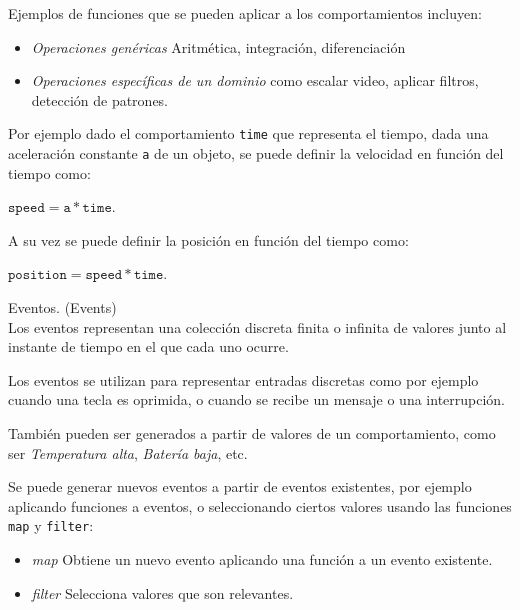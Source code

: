   Ejemplos de funciones que se pueden aplicar a los
comportamientos incluyen:

\begin{itemize}
\item \textit{Operaciones genéricas} Aritmética, integración, diferenciación
\item {
    \textit{Operaciones específicas de un dominio} como escalar video,
    aplicar filtros, detección de patrones.
}
\end{itemize}

  Por ejemplo dado el comportamiento \texttt{time} que representa el tiempo,
dada una aceleración constante \texttt{a} de un objeto, se puede definir la
velocidad en función del tiempo como:
    \begin{center}
    $\texttt{speed} = \texttt{a} * \texttt{time}$.
    \end{center}
  
  A su vez se puede definir la posición en función del tiempo como:
  \begin{center}    
  $\texttt{position} = \texttt{speed} * \texttt{time}$.
  \end{center}

\begin{definicion}
  Eventos. (Events)\cite{petersonhudakelliot99:lambdainmotion} \\

  Los eventos representan una colección discreta finita o infinita de valores
  junto al instante de tiempo en el que cada uno ocurre.


\end{definicion}

  Los eventos se utilizan para representar entradas discretas como por
ejemplo cuando una tecla es oprimida, o cuando se recibe un
mensaje o una interrupción.

  También pueden ser generados a partir de valores de un comportamiento,
como ser \emph{Temperatura alta}, \emph{Batería baja}, etc.

  Se puede generar nuevos eventos a partir de eventos existentes, por
ejemplo aplicando funciones a eventos, o seleccionando ciertos valores
usando las funciones \texttt{map} y \texttt{filter}:

\begin{itemize}
  \item {
      \textit{map} Obtiene un nuevo evento aplicando una función
                   a un evento existente.
  }
  \item {
      \textit{filter} Selecciona valores que son relevantes.
  }
\end{itemize}


